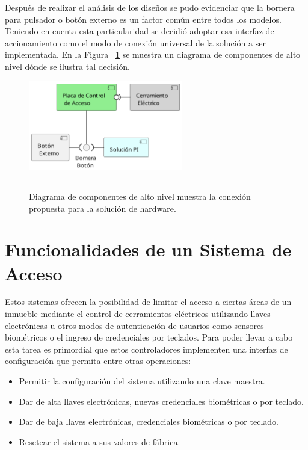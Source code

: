 Después de realizar el análisis de los diseños se pudo evidenciar que la bornera para pulsador o botón externo es un factor común entre todos los modelos. Teniendo en cuenta esta particularidad se decidió adoptar esa interfaz de accionamiento como el modo de conexión universal de la solución a ser implementada. En la Figura ~\ref{fig:componentes_controladora+sol} se muestra un diagrama de componentes de alto nivel dónde se ilustra tal decisión.
\begin{figure}[htbp]
	\centering
	\includegraphics[width=0.6\textwidth]{Pictures/COMP_electric_locks.png}
	\rule{35em}{1pt}
	\caption[Diagrama de Componentes Conexión al Controlador]{Diagrama de componentes de alto nivel muestra la conexión propuesta para la solución de hardware.}
	\label{fig:componentes_controladora+sol}
\end{figure}
\section{Funcionalidades de un Sistema de Acceso}
Estos sistemas ofrecen la posibilidad de limitar el acceso a ciertas áreas de un inmueble mediante el control de cerramientos eléctricos utilizando llaves electrónicas u otros modos de autenticación de usuarios como sensores biométricos o el ingreso de credenciales por teclados. Para poder llevar a cabo esta tarea es primordial que estos controladores implementen una interfaz de configuración que permita entre otras operaciones:
\begin{itemize}
	\item Permitir la configuración del sistema utilizando una clave maestra.
	\item Dar de alta llaves electrónicas, nuevas credenciales biométricas o por teclado.
	\item Dar de baja llaves electrónicas, credenciales biométricas o por teclado.
	\item Resetear el sistema a sus valores de fábrica.
\end{itemize}
